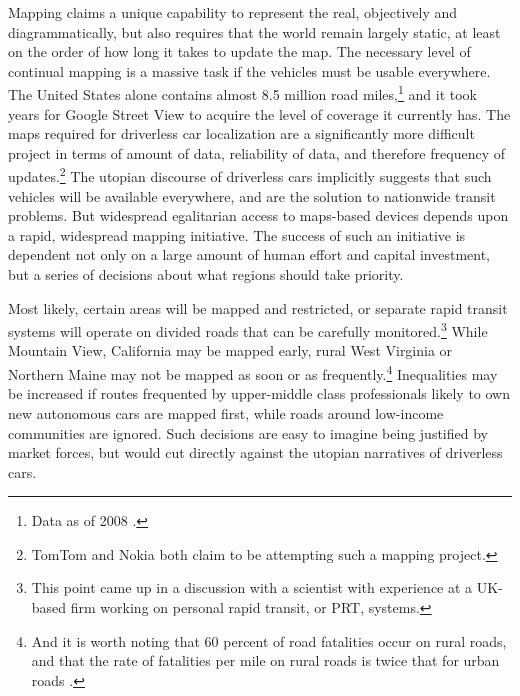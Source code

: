 Mapping claims a unique capability to
represent the real, objectively
and diagrammatically, but also requires that the world remain largely
static, at least on the order of how long it takes to update the map.
The necessary level of continual mapping is a massive task if the 
vehicles must be usable everywhere. The United States alone contains almost
8.5 million road miles,\footnote{Data as of 2008 \cite{carneyMiles}.}
and it took years for Google Street View to acquire the level of
coverage it currently has. The maps required for driverless car
localization are a significantly more difficult project in terms of
amount of data, reliability of data, and therefore frequency of
updates.\footnote{TomTom \cite{tomtommaps} and Nokia \cite{ubergizmo}
  both claim to be attempting such 
a mapping project.} The utopian discourse of driverless cars
implicitly suggests that such vehicles will be available everywhere,
and are the solution to nationwide transit problems. But widespread
egalitarian access to maps-based devices depends upon a rapid,
widespread mapping initiative. The success of such an initiative is
dependent not only on a large amount of human effort and capital
investment, but a series of decisions about what regions should take priority.

Most likely,
certain areas will be 
mapped and restricted, or separate rapid transit
systems will operate on divided roads that can be carefully
monitored.\footnote{This point came up in a discussion with a
  scientist with experience at a UK-based firm working on personal
  rapid transit, or PRT, systems.} While
Mountain View, California may be mapped early, rural West Virginia or
Northern Maine may not be mapped as soon or as
frequently.\footnote{And it is worth noting that 60 percent of road
  fatalities occur on rural roads, and that the rate of fatalities per
mile on rural roads is twice that for urban roads \cite[p. 11]{broviakCars}.}
Inequalities may be increased if routes frequented by upper-middle
class professionals likely to own new autonomous cars
are mapped first, while roads around low-income communities are
ignored. Such decisions are easy to imagine being justified by
market forces, but would
cut directly against the utopian narratives of driverless cars.

